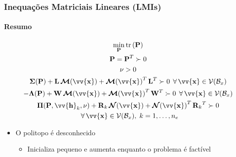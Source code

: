\documentclass{beamer}
\DeclareMathOperator{\trace}{tr}
\newcommand*{\Round}[1]{\left(#1\right)}
\newcommand*{\Prod}{\,}
\newcommand*{\Bold}[1]{\boldsymbol{\mathbf{#1}}}
\newcommand*{\Matr}[1]{\Bold{#1}}
\newcommand*{\Vect}[1]{\vv{\Bold{#1}}}
\newcommand*{\Transp}[1]{{#1}^{T}}
\newcommand*{\Trace}[1]{\trace\Round{#1}}
\newcommand*{\ForAll}{\:\:\forall\,}
\renewcommand{\Prod}{\,}
\begin{document}
\begin{frame}\frametitle{Inequações Matriciais Lineares (LMIs)}\framesubtitle{Resumo}
  \begin{gather}
    \min_{\Matr{P}} \Trace{\Matr{P}}
    \\
    \Matr{P} = \Transp{\Matr{P}} \succ 0
    \\
    \nu > 0
    \\
    \Matr{\Sigma}(\Matr{P}) + \Matr{L} \Prod \Matr{\mathcal{M}}(\Vect{x}) + \Transp{\Matr{\mathcal{M}}(\Vect{x})} \Prod \Transp{\Matr{L}} \succ 0
    \ForAll \Vect{x} \in \mathcal{V}(\mathcal{B}_x)
    \\
    -\Matr{\Lambda}(\Matr{P}) + \Matr{W} \Prod \Matr{\mathcal{M}}(\Vect{x}) + \Transp{\Matr{\mathcal{M}}(\Vect{x})} \Prod \Transp{\Matr{W}} \succ 0
    \ForAll \Vect{x} \in \mathcal{V}(\mathcal{B}_x)
    \\
    \Matr{\Pi}(\Matr{P}, \Vect{h}_k, \nu) + \Matr{R}_k \Prod \Matr{\mathcal{N}}(\Vect{x}) + \Transp{\Matr{\mathcal{N}}(\Vect{x})} \Prod \Transp{\Matr{R}_k} \succ 0
    \\\ForAll \Vect{x} \in \mathcal{V}(\mathcal{B}_x)
    ,\; k = 1, \dotsc, n_e
  \end{gather}
  \begin{itemize}
    \item O politopo é desconhecido
    \begin{itemize}
      \item Inicializa pequeno e aumenta enquanto o problema é factível
    \end{itemize}
  \end{itemize}
\end{frame}
\end{document}
